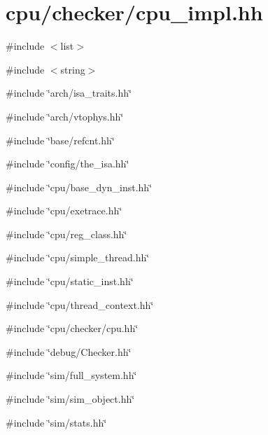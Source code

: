 \hypertarget{checker_2cpu__impl_8hh}{
\section{cpu/checker/cpu\_\-impl.hh}
\label{checker_2cpu__impl_8hh}
}
{\ttfamily \#include $<$list$>$}\par
{\ttfamily \#include $<$string$>$}\par
{\ttfamily \#include \char`\"{}arch/isa\_\-traits.hh\char`\"{}}\par
{\ttfamily \#include \char`\"{}arch/vtophys.hh\char`\"{}}\par
{\ttfamily \#include \char`\"{}base/refcnt.hh\char`\"{}}\par
{\ttfamily \#include \char`\"{}config/the\_\-isa.hh\char`\"{}}\par
{\ttfamily \#include \char`\"{}cpu/base\_\-dyn\_\-inst.hh\char`\"{}}\par
{\ttfamily \#include \char`\"{}cpu/exetrace.hh\char`\"{}}\par
{\ttfamily \#include \char`\"{}cpu/reg\_\-class.hh\char`\"{}}\par
{\ttfamily \#include \char`\"{}cpu/simple\_\-thread.hh\char`\"{}}\par
{\ttfamily \#include \char`\"{}cpu/static\_\-inst.hh\char`\"{}}\par
{\ttfamily \#include \char`\"{}cpu/thread\_\-context.hh\char`\"{}}\par
{\ttfamily \#include \char`\"{}cpu/checker/cpu.hh\char`\"{}}\par
{\ttfamily \#include \char`\"{}debug/Checker.hh\char`\"{}}\par
{\ttfamily \#include \char`\"{}sim/full\_\-system.hh\char`\"{}}\par
{\ttfamily \#include \char`\"{}sim/sim\_\-object.hh\char`\"{}}\par
{\ttfamily \#include \char`\"{}sim/stats.hh\char`\"{}}\par
